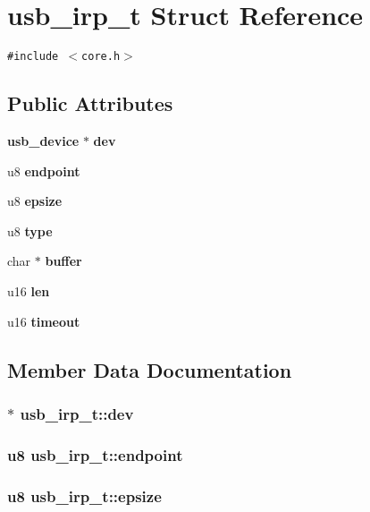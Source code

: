 \section{usb\_\-irp\_\-t Struct Reference}
\label{structusb__irp__t}
{\tt \#include $<$core.h$>$}

\subsection*{Public Attributes}
\begin{CompactItemize}
\item 
{\bf usb\_\-device} $\ast$ {\bf dev}
\item 
u8 {\bf endpoint}
\item 
u8 {\bf epsize}
\item 
u8 {\bf type}
\item 
char $\ast$ {\bf buffer}
\item 
u16 {\bf len}
\item 
u16 {\bf timeout}
\end{CompactItemize}


\subsection{Member Data Documentation}
\subsubsection{$\ast$ {\bf usb\_\-irp\_\-t::dev}}\label{structusb__irp__t_e04ce88d979c32213334c48e85f6f580}


\subsubsection{\setlength{\rightskip}{0pt plus 5cm}u8 {\bf usb\_\-irp\_\-t::endpoint}}\label{structusb__irp__t_b0279b91f248155736259f01f1c63cff}


\subsubsection{\setlength{\rightskip}{0pt plus 5cm}u8 {\bf usb\_\-irp\_\-t::epsize}}\label{structusb__irp__t_31f047a15ada2ec3359a453116a7aef5}



